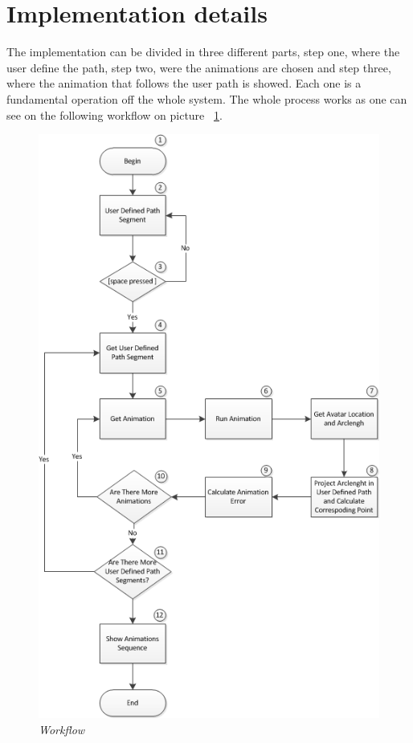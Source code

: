 \documentclass[a4paper]{article}
\begin{document}
\section{Implementation details}
The implementation can be divided in three  different parts, step one, where the user define the path, step two, were the animations are chosen and step three, where the animation that follows the user path is showed. Each one is a fundamental operation off the whole system. The whole process works as one can see on the following workflow on picture ~\ref{fig:work}.
\\
\begin{figure}[hbtp]
\begin{center}
\includegraphics[scale=0.8]{Images/fluxograma.png} 
\caption{\textit{Workflow}}
\label{fig:work}
\end{center}
\end{figure}
\end{document}
